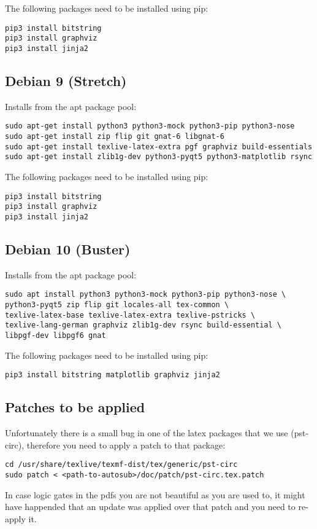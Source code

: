 The following packages need to be installed using pip:

\begin{verbatim}
pip3 install bitstring
pip3 install graphviz
pip3 install jinja2
\end{verbatim}


\subsection{Debian 9 (Stretch)}

Installs from the apt package pool:

\begin{verbatim}
sudo apt-get install python3 python3-mock python3-pip python3-nose
sudo apt-get install zip flip git gnat-6 libgnat-6
sudo apt-get install texlive-latex-extra pgf graphviz build-essentials
sudo apt-get install zlib1g-dev python3-pyqt5 python3-matplotlib rsync
\end{verbatim}

The following packages need to be installed using pip:

\begin{verbatim}
pip3 install bitstring
pip3 install graphviz
pip3 install jinja2
\end{verbatim}


\subsection{Debian 10 (Buster)}
Installs from the apt package pool:

\begin{verbatim}
sudo apt install python3 python3-mock python3-pip python3-nose \
python3-pyqt5 zip flip git locales-all tex-common \
texlive-latex-base texlive-latex-extra texlive-pstricks \
texlive-lang-german graphviz zlib1g-dev rsync build-essential \
libpgf-dev libpgf6 gnat
\end{verbatim}

The following packages need to be installed using pip:

\begin{verbatim}
pip3 install bitstring matplotlib graphviz jinja2
\end{verbatim}

\subsection{Patches to be applied}
Unfortunately there is a small bug in one of the latex packages that we use
(pst-circ), therefore you need to apply a patch to that package:

\begin{verbatim}
cd /usr/share/texlive/texmf-dist/tex/generic/pst-circ
sudo patch < <path-to-autosub>/doc/patch/pst-circ.tex.patch
\end{verbatim}

In case logic gates in the pdfs you are not beautiful as you are used to, it might have
happended that an update was applied over that patch and you need to re-apply it.
